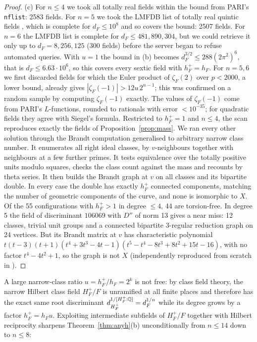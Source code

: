 \documentclass[11pt]{amsart}
\numberwithin{equation}{section}
\theoremstyle{plain}
\theoremstyle{definition}\newtheorem{definition}[theorem]{Definition}
\theoremstyle{remark}\newtheorem{remark}[theorem]{Remark}
\begin{document}
\begin{proof}
(c) For $n\le4$ we took all totally real fields within the bound from PARI's \texttt{nflist}: 2583 fields. For $n=5$ we took the LMFDB list of totally real quintic fields \cite{lmfdb}, which is complete for $d_F\le10^8$ and so covers the bound: 2507 fields. For $n=6$ the LMFDB list is complete for $d_F\le481{,}890{,}304$, but we could retrieve it only up to $d_F=8{,}256{,}125$ (300 fields) before the server began to refuse automated queries. With $u=1$ the bound in (b) becomes $d_F^{3/2}\le288(2\pi^2)^6$, that is $d_F\le6.63\cdot10^6$, so this covers every sextic field with $h_F^+=h_F$. For $n=5,6$ we first discarded fields for which the Euler product of $\zeta_F(2)$ over $p<2000$, a lower bound, already gives $|\zeta_F(-1)|>12u\,2^{n-1}$; this was confirmed on a random sample by computing $\zeta_F(-1)$ exactly. The values of $\zeta_F(-1)$ come from PARI's $L$-functions, rounded to rationals with error $<10^{-35}$; for quadratic fields they agree with Siegel's formula. Restricted to $h_F^+=1$ and $n\le4$, the scan reproduces exactly the fields of Proposition~\ref{prop:mass}. We ran every other solution through the Brandt computation generalised to arbitrary narrow class number. It enumerates all right ideal classes, by $v$-neighbours together with neighbours at a few further primes. It tests equivalence over the totally positive units modulo squares, checks the class count against the mass and recounts by theta series. It then builds the Brandt graph at $v$ on all classes and its bipartite double. In every case the double has exactly $h_F^+$ connected components, matching the number of geometric components of the curve, and none is isomorphic to $X$. Of the 55 configurations with $h_F^+>1$ in degree $\le4$, 44 are torsion-free. In degree 5 the field of discriminant $106069$ with $D''$ of norm 13 gives a near miss: 12 classes, trivial unit groups and a connected bipartite 3-regular reduction graph on 24 vertices. But its Brandt matrix at $v$ has characteristic polynomial $t(t-3)(t+1)(t^4+3t^3-4t-1)(t^5-t^4-8t^3+8t^2+15t-16)$, with no factor $t^4-4t^2+1$, so the graph is not $X$ (independently reproduced from scratch in ).
\end{proof}

A large narrow-class ratio $u=h_F^+/h_F=2^k$ is not free: by class field theory, the narrow Hilbert class field $H_F^+/F$ is unramified at all finite places and therefore has the exact same root discriminant $d_{H_F^+}^{1/[H_F^+:\mathbb{Q}]}=d_F^{1/n}$ while its degree grows by a factor $h_F^+=h_Fu$. Exploiting intermediate subfields of $H_F^+/F$ together with Hilbert reciprocity sharpens Theorem~\ref{thm:anyh}(b) unconditionally from $n\le14$ down to $n\le8$:
\end{document}

